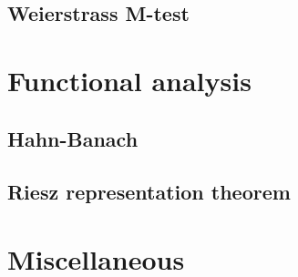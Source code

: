 \documentclass[a4paper,12pt,twoside,BCOR=10mm]{scrbook}
\begin{document}
\subsection{Weierstrass M-test}
\section{Functional analysis}
\subsection{Hahn-Banach}
\subsection{Riesz representation theorem}
\section{Miscellaneous}
\end{document}
